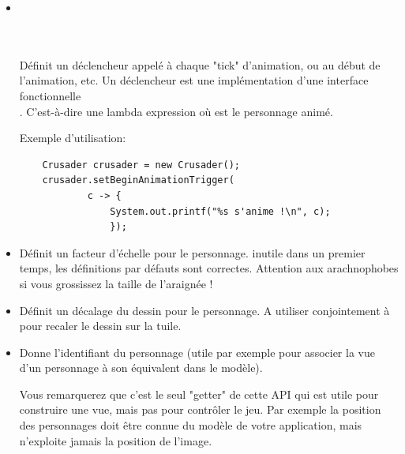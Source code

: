 \documentclass[11pt]{article}
\begin{document}
\begin{itemize}
     Définit la vitesse d'animation pour un mode donné en nombre d'images par unité d'animation du windowGame. 
     Fixé à 1f, il est inutile de le modifier dans un premier temps, mais vous pouvez produire un effet de ralenti en le modifiant.

\item {}\\
\\
\\

    Définit un déclencheur appelé à chaque "tick" d'animation, ou au début de l'animation, etc.
    Un déclencheur est une implémentation d'une interface fonctionnelle \\. 
    C'est-à-dire une lambda expression  où  est le personnage animé.

    Exemple d'utilisation:

\begin{lstlisting}
    Crusader crusader = new Crusader();
    crusader.setBeginAnimationTrigger(
            c -> {
                System.out.printf("%s s'anime !\n", c);
                });
\end{lstlisting}


\item {}

    Définit un facteur d'échelle pour le personnage. inutile dans un premier temps, les définitions par défauts sont correctes.
    Attention aux arachnophobes si vous grossissez la taille de l'araignée !

\item {}

    Définit un décalage du dessin pour le personnage. A utiliser conjointement à  pour recaler le dessin sur la tuile.

    \item {}

    Donne l'identifiant du personnage (utile par exemple pour associer la vue d'un personnage à son équivalent dans le modèle).

    Vous remarquerez que c'est le seul "getter" de cette API qui est utile pour construire une vue, mais pas pour contrôler le jeu. Par exemple la position des personnages doit être connue du modèle de votre application, mais n'exploite jamais la position de l'image.

\end{itemize}   
\end{document}
